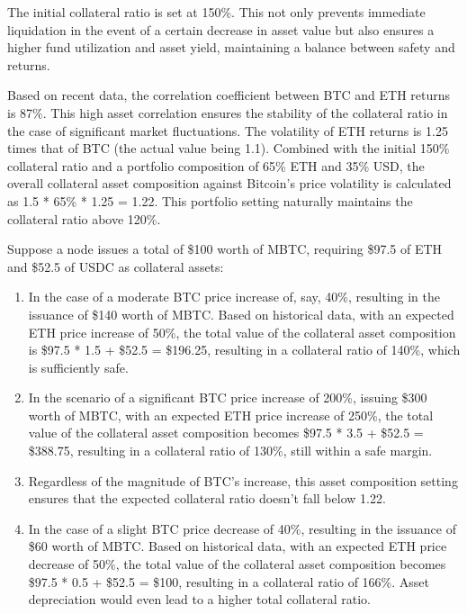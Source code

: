 \documentclass{article}
\begin{document}
\par The initial collateral ratio is set at 150\%. This not only prevents immediate liquidation in the event of a certain decrease in asset value but also ensures a higher fund utilization and asset yield, maintaining a balance between safety and returns.
\par Based on recent data, the correlation coefficient between BTC and ETH returns is 87\%. This high asset correlation ensures the stability of the collateral ratio in the case of significant market fluctuations. The volatility of ETH returns is 1.25 times that of BTC (the actual value being 1.1). Combined with the initial 150\% collateral ratio and a portfolio composition of 65\% ETH and 35\% USD, the overall collateral asset composition against Bitcoin's price volatility is calculated as 1.5 * 65\% * 1.25 = 1.22. This portfolio setting naturally maintains the collateral ratio above 120\%.
\par Suppose a node issues a total of \$100 worth of MBTC, requiring \$97.5 of ETH and \$52.5 of USDC as collateral assets:
\begin{enumerate}
    \item In the case of a moderate BTC price increase of, say, 40\%, resulting in the issuance of \$140 worth of MBTC. Based on historical data, with an expected ETH price increase of 50\%, the total value of the collateral asset composition is \$97.5 * 1.5 + \$52.5 = \$196.25, resulting in a collateral ratio of 140\%, which is sufficiently safe.
    \item In the scenario of a significant BTC price increase of 200\%, issuing \$300 worth of MBTC, with an expected ETH price increase of 250\%, the total value of the collateral asset composition becomes \$97.5 * 3.5 + \$52.5 = \$388.75, resulting in a collateral ratio of 130\%, still within a safe margin.
    \item Regardless of the magnitude of BTC's increase, this asset composition setting ensures that the expected collateral ratio doesn't fall below 1.22.
    \item In the case of a slight BTC price decrease of 40\%, resulting in the issuance of \$60 worth of MBTC. Based on historical data, with an expected ETH price decrease of 50\%, the total value of the collateral asset composition becomes \$97.5 * 0.5 + \$52.5 = \$100, resulting in a collateral ratio of 166\%. Asset depreciation would even lead to a higher total collateral ratio.
\end{enumerate}
\end{document}
